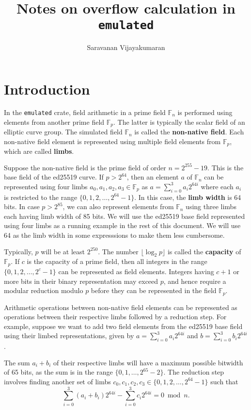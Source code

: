 \documentclass[a4paper, 12pt]{article}
\title{Notes on overflow calculation in \texttt{emulated}}
\author{Saravanan Vijayakumaran}
\begin{document}
\maketitle

\section{Introduction}%
\label{sec:introduction}

In the \texttt{emulated} crate, field arithmetic in a prime field $\mathbb{F}_n$ is performed using elements from another prime field $\mathbb{F}_p$. The latter is typically the scalar field of an elliptic curve group. The simulated field $\mathbb{F}_n$ is called the \textbf{non-native field}.
Each non-native field element is represented using multiple field elements from $\mathbb{F}_p$, which are called \textbf{limbs}. 

Suppose the non-native field is the prime field of order $n = 2^{255}-19$. This is the base field of the ed25519 curve. If $p > 2^{64}$, then an element $a$ of $\mathbb{F}_n$ can be represented using four limbs $a_0, a_1, a_2, a_3 \in \mathbb{F}_p$ as 
    $a = \sum_{i=0}^3 a_i 2^{64i}$ where each $a_i$ is restricted to the range $\{0,1,2,\ldots,2^{64}-1\}$. In this case, the \textbf{limb width} is 64 bits. In case $p > 2^{85}$, we can also represent elements from $\mathbb{F}_n$ using three limbs each having limb width of 85 bits. We will use the ed25519 base field represented using four limbs as a running example in the rest of this document. We will use 64 as the limb width in some expresssions to make them less cumbersome.

Typically, $p$ will be at least $2^{250}$. The number $\lfloor \log_2 p \rfloor$ is called the \textbf{capacity} of $\mathbb{F}_p$. If $c$ is the capacity of a prime field, then all integers in the range $\{0,1,2,\ldots, 2^c-1\}$ can be represented as field elements. Integers having $c+1$ or more bits  in their binary representation may exceed $p$, and hence require a modular reduction modulo $p$ before they can be represented in the field $\mathbb{F}_p$.

Arithmetic operations between non-native field elements can be represented as operations between their respective limbs followed by a reduction step. For example, suppose we want to add two field elements from the ed25519 base field using their limbed representations, given by $a = \sum_{i=0}^3 a_i 2^{64i}$ and $b = \sum_{i=0}^3 b_i 2^{64i}$.

The sum $a_i + b_i$ of their respective limbs will have a maximum possible bitwidth of 65 bits, as the sum is in the range $\{0,1,\ldots, 2^{65}-2\}$. The reduction step involves finding another set of limbs $c_0, c_1, c_2, c_3 \in \{0,1,2,\ldots,2^{64}-1\}$ such that 
\begin{equation*}
\sum_{i=0}^3 (a_i + b_i) 2^{64i} - \sum_{i=0}^3 c_i 2^{64i} = 0 \bmod n.
\end{equation*}
\end{document}
